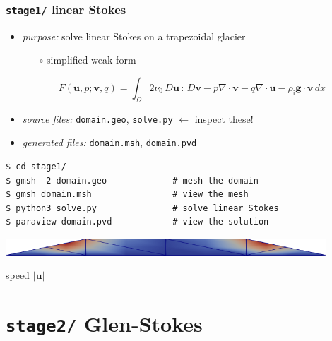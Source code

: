 \documentclass[10pt,
               hyperref={colorlinks,citecolor=DeepPink4,linkcolor=black,urlcolor=blue},
               svgnames]{beamer}
\newcommand{\bv}{\mathbf{v}}
\newcommand{\bu}{\mathbf{u}}
\newcommand{\rhoi}{\rho_{\text{i}}}
\begin{document}
\begin{frame}[fragile]
\frametitle{\texttt{stage1/} \qquad linear Stokes}

\begin{itemize}
\item \emph{purpose:} solve linear Stokes on a trapezoidal glacier

    \begin{itemize}
    \item[$\circ$] simplified weak form
    \end{itemize}
{\small
    $$F(\bu,p;\bv,q) = \int_{\Omega} 2 \nu_0\, D\bu\,:\,D\bv - p \nabla \cdot \bv - q \nabla \cdot \bu - \rhoi \mathbf{g} \cdot \bv \,dx$$
}
\item \emph{source files:} \texttt{domain.geo}, \texttt{solve.py} \hfill \alert{$\gets$ inspect these!}
\item \emph{generated files:} \texttt{domain.msh}, \texttt{domain.pvd}
\end{itemize}

\bigskip
\begin{Verbatim}
$ cd stage1/
$ gmsh -2 domain.geo             # mesh the domain
$ gmsh domain.msh                # view the mesh
$ python3 solve.py               # solve linear Stokes
$ paraview domain.pvd            # view the solution
\end{Verbatim}

\vspace{5mm}
\begin{center}
\includegraphics[width=0.9\textwidth]{figs/stage1.png}

{\tiny speed $|\bu|$}
\end{center}
\end{frame}


\section{\texttt{stage2/} \qquad Glen-Stokes}
\end{document}
